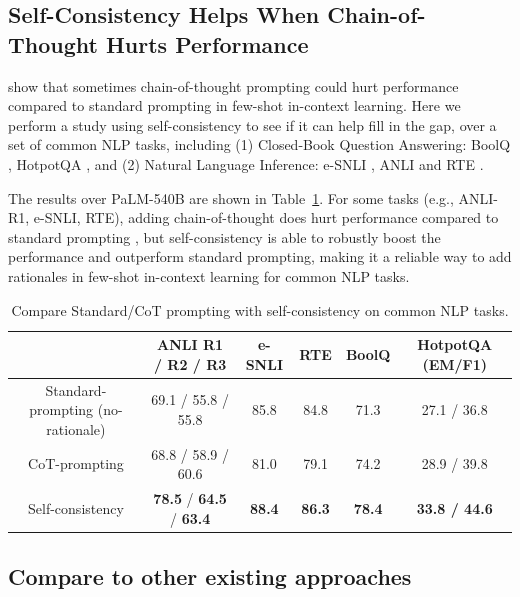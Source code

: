 \documentclass{article} %
\begin{document}
\subsection{Self-Consistency Helps When Chain-of-Thought Hurts Performance}
\citet{ye2022unreliability} show that sometimes chain-of-thought prompting could hurt performance compared to standard prompting in few-shot in-context learning.
Here we perform a study using self-consistency to see if it can help fill in the gap, over a set of common NLP tasks, including (1) Closed-Book Question Answering: BoolQ \citep{clark2019boolq}, HotpotQA \citep{yang-etal-2018-hotpotqa}, and (2) Natural Language Inference: e-SNLI \citep{esnli}, ANLI \citep{nie-etal-2020-adversarial} and RTE \citep{dagan2005pascal,bar2006second,giampiccolo2007third,bentivogli2009fifth}.

The results over PaLM-540B are shown in Table~\ref{tab:common_nlp}. 
For some tasks (e.g., ANLI-R1, e-SNLI, RTE), adding chain-of-thought does hurt performance compared to standard prompting \citep{brown2020language}, but self-consistency is able to robustly boost the performance and outperform standard prompting, making it a reliable way to add rationales in few-shot in-context learning for common NLP tasks.

\begin{table}[h]
\vspace{-0.1in}
\small
\setlength\tabcolsep{4pt}
    \centering
    \begin{tabular}{c ccccc}
    \toprule
    & ANLI R1 / R2 / R3 & e-SNLI & RTE & BoolQ & HotpotQA (EM/F1) \\
    \midrule
    Standard-prompting (no-rationale) & 69.1 / 55.8 / 55.8 &  85.8 & 84.8 & 71.3 & 27.1 / 36.8  \\
    CoT-prompting \citep{wei2022chain} & 68.8 / 58.9 / 60.6 & 81.0 & 79.1  & 74.2 & 28.9 / 39.8  \\
    \midrule
    Self-consistency & \textbf{78.5} / \textbf{64.5} / \textbf{63.4} & \textbf{88.4} & \textbf{86.3} & \textbf{78.4} & \textbf{33.8 / 44.6}\\
    \bottomrule
    \end{tabular}
    \vspace{-0.1in}
    \caption{Compare Standard/CoT prompting with self-consistency on common NLP tasks. }
    \label{tab:common_nlp}
\vspace{-0.1in}
\end{table}

\subsection{Compare to other existing approaches}
\label{sec:ablation_compare}
\end{document}
